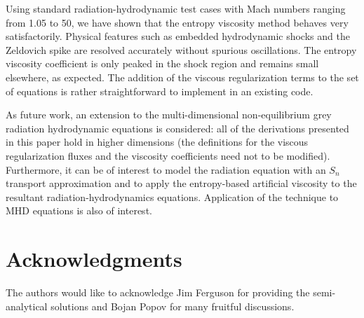 \documentclass[review]{elsarticle}
\begin{document}
Using standard radiation-hydrodynamic test cases with Mach numbers ranging from 1.05 to 50, we have shown that the entropy viscosity method behaves very satisfactorily. Physical features such as embedded hydrodynamic shocks and the Zeldovich spike are resolved accurately without spurious oscillations. The entropy viscosity coefficient is only peaked in the shock region and remains small elsewhere, as expected. 
The addition of the viscous regularization terms to the set of equations is rather straightforward to implement in an existing code.

As future work, an extension to the multi-dimensional non-equilibrium grey radiation hydrodynamic equations is considered: all of the derivations presented in this paper hold in higher dimensions (the definitions for the viscous regularization fluxes and the viscosity coefficients need not to be modified). Furthermore, it can be of interest to model the radiation equation with an $S_n$ transport approximation and to apply the entropy-based artificial viscosity to the resultant radiation-hydrodynamics equations. Application of the technique to MHD equations is also of interest. 

\section*{Acknowledgments}
The authors would like to acknowledge Jim Ferguson for providing the semi-analytical solutions and Bojan Popov for many fruitful discussions. 
\end{document}

